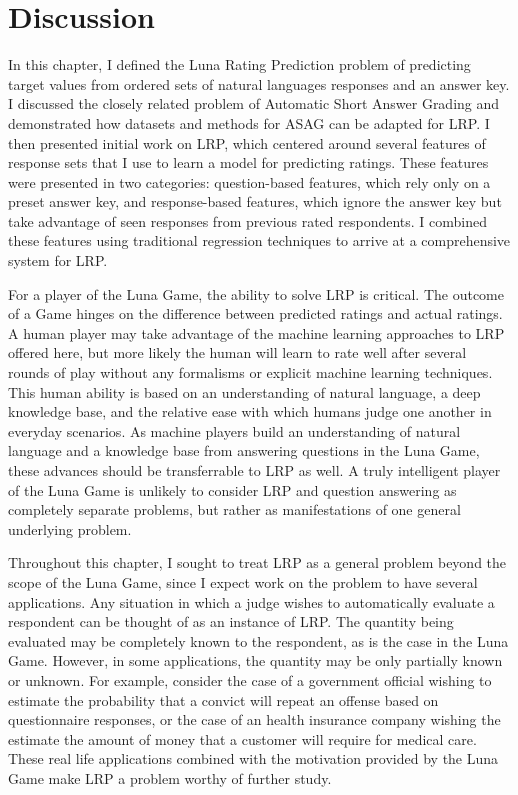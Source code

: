 \section{Discussion}
In this chapter, I defined the Luna Rating Prediction problem of predicting target values from ordered sets of natural languages responses and an answer key. I discussed the closely related problem of Automatic Short Answer Grading and demonstrated how datasets and methods for ASAG can be adapted for LRP. I then presented initial work on LRP, which centered around several features of response sets that I use to learn a model for predicting ratings. These features were presented in two categories: question-based features, which rely only on a preset answer key, and response-based features, which ignore the answer key but take advantage of seen responses from previous rated respondents. I combined these features using traditional regression techniques to arrive at a comprehensive system for LRP.

For a player of the Luna Game, the ability to solve LRP is critical. The outcome of a Game hinges on the difference between predicted ratings and actual ratings. A human player may take advantage of the machine learning approaches to LRP offered here, but more likely the human will learn to rate well after several rounds of play without any formalisms or explicit machine learning techniques. This human ability is based on an understanding of natural language, a deep knowledge base, and the relative ease with which humans judge one another in everyday scenarios. As machine players build an understanding of natural language and a knowledge base from answering questions in the Luna Game, these advances should be transferrable to LRP as well. A truly intelligent player of the Luna Game is unlikely to consider LRP and question answering as completely separate problems, but rather as manifestations of one general underlying problem.

Throughout this chapter, I sought to treat LRP as a general problem beyond the scope of the Luna Game, since I expect work on the problem to have several applications. Any situation in which a judge wishes to automatically evaluate a respondent can be thought of as an instance of LRP. The quantity being evaluated may be completely known to the respondent, as is the case in the Luna Game. However, in some applications, the quantity may be only partially known or unknown. For example, consider the case of a government official wishing to estimate the probability that a convict will repeat an offense based on questionnaire responses, or the case of an health insurance company wishing the estimate the amount of money that a customer will require for medical care. These real life applications combined with the motivation provided by the Luna Game make LRP a problem worthy of further study.
